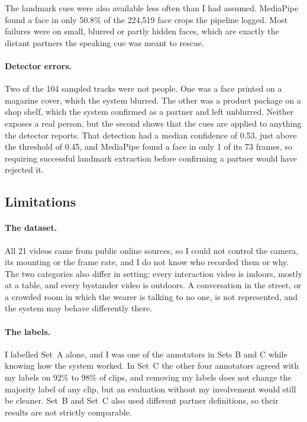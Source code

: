 The landmark cues were also available less often than I had assumed. MediaPipe found a
face in only 50.8\% of the 224{,}519 face crops the pipeline logged. Most failures were on
small, blurred or partly hidden faces, which are exactly the distant partners the
speaking cue was meant to rescue.

\paragraph{Detector errors.}
Two of the 104 sampled tracks were not people. One was a face printed on a magazine
cover, which the system blurred. The other was a product package on a shop shelf, which
the system confirmed as a partner and left unblurred. Neither exposes a real person, but
the second shows that the cues are applied to anything the detector reports. That
detection had a median confidence of 0.53, just above the threshold of 0.45, and MediaPipe
found a face in only 1 of its 73 frames, so requiring successful landmark extraction before
confirming a partner would have rejected it.

\subsection{Limitations}
\label{sec:disc_limitations}

\paragraph{The dataset.}
All 21 videos came from public online sources, so I could not control the camera, its
mounting or the frame rate, and I do not know who recorded them or why. The two categories
also differ in setting: every interaction video is indoors, mostly at a table, and every
bystander video is outdoors. A conversation in the street, or a crowded room in which the
wearer is talking to no one, is not represented, and the system may behave differently
there.

\paragraph{The labels.}
I labelled Set~A alone, and I was one of the annotators in Sets B and C while knowing how
the system worked. In Set~C the other four annotators agreed with my labels on 92\% to 98\%
of clips, and removing my labels does not change the majority label of any clip, but an
evaluation without my involvement would still be cleaner. Set~B and Set~C also used different
partner definitions, so their results are not strictly comparable.


